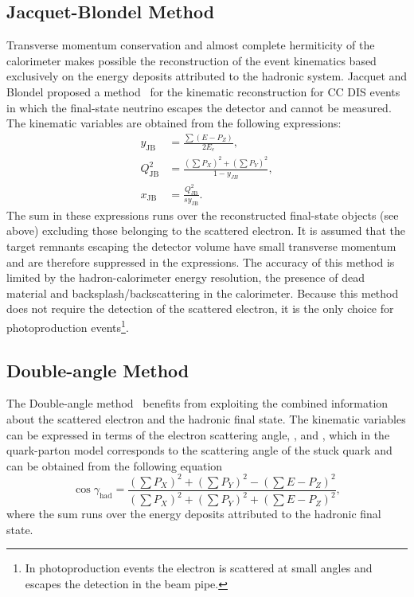 \subsection{Jacquet-Blondel Method}
\label{subsec:jb}
Transverse momentum conservation and almost complete hermiticity of the \zeus calorimeter makes  possible the reconstruction of the event kinematics based exclusively on the energy deposits attributed to the hadronic system. Jacquet and Blondel proposed a method~\cite{proc:epfacility:1979:391} for the kinematic reconstruction for CC DIS events in which the final-state neutrino escapes the detector and cannot be measured. The kinematic variables are obtained from the following expressions:
\begin{align}
	y_\text{JB}      &= \frac{\sum{ \left( E - P_{Z} \right) }}{2E_e},			\label{eq:ybj} \\
	Q^2_\text{JB} &= \frac{ \left( \sum{P_{X}} \right)^2 + \left( \sum{P_{Y}} \right)^2 }{1-y_{JB}},			\label{eq:q2jb}							\\
	x_\text{JB}      &= \frac{Q^2_\text{JB}}{s y_\text{JB}}.			\label{eq:xjb}
\end{align}
The sum in these expressions runs over the reconstructed final-state objects (see above) excluding those belonging to the scattered electron. It is assumed that the target remnants escaping the detector volume have small transverse momentum and are therefore suppressed in the expressions. The accuracy of this method is limited by the hadron-calorimeter energy resolution, the presence of dead material and backsplash/backscattering in the calorimeter. Because this method does not require the detection of the scattered electron, it is the only choice for photoproduction events\footnote{In photoproduction events the electron is scattered at small angles and escapes the detection in the beam pipe.}.
\subsection{Double-angle Method}
\label{subsec:da}
The Double-angle method~\cite{proc:hera:1991:23} benefits from exploiting the combined information about the scattered electron and the hadronic final state. The kinematic variables can be expressed in terms of the electron scattering angle, \thetae, and \gamha, which in the quark-parton model corresponds to the scattering angle of the stuck quark and can be obtained from the following equation
\begin{equation}
\cos \gamma_{\text{had}} = \frac{ \left( \sum{P_{X}} \right)^2 + \left( \sum{P_{Y}} \right)^2 - (\sum{E - P_{Z}})^2 }{\left( \sum{P_{X}} \right)^2 + \left( \sum{P_{Y}} \right)^2 + (\sum{E - P_{Z}})^2},
\label{eq:cosgam}
\end{equation}
where the sum runs over the energy deposits attributed to the hadronic final state.

